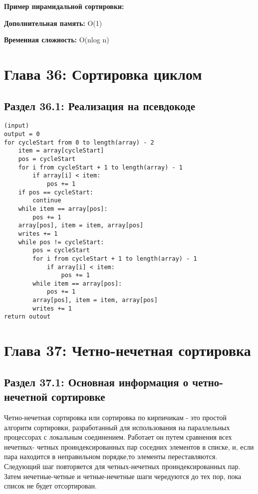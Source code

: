 \vspace{\baselineskip}
\textbf{Пример пирамидальной сортировки:}

\vspace{\baselineskip}

\vspace{\baselineskip}
\textbf{Дополнительная память:} O(1)

\textbf{Временная сложность:} O(nlog n)

\vspace{\baselineskip}

\chapter*{Глава 36: Сортировка циклом}
\section*{Раздел 36.1: Реализация на псевдокоде} 

\vspace{\baselineskip}
\begin{tcolorbox}
\begin{verbatim} 
(input)
output = 0
for cycleStart from 0 to length(array) - 2
    item = array[cycleStart]
    pos = cycleStart
    for i from cycleStart + 1 to length(array) - 1
        if array[i] < item:
            pos += 1
    if pos == cycleStart:
        continue
    while item == array[pos]:
        pos += 1
    array[pos], item = item, array[pos]
    writes += 1
    while pos != cycleStart:
        pos = cycleStart
        for i from cycleStart + 1 to length(array) - 1
            if array[i] < item:
                pos += 1
        while item == array[pos]:
            pos += 1
        array[pos], item = item, array[pos]
        writes += 1
return outout

\end{verbatim}
\end{tcolorbox}

\chapter*{Глава 37: Четно-нечетная сортировка}
\section*{Раздел 37.1: Основная информация о четно-нечетной сортировке} 

\vspace{\baselineskip}
Четно-нечетная сортировка или сортировка по кирпичикам - это простой алгоритм сортировки, разработанный для использования на параллельных процессорах с локальным соединением. Работает он путем сравнения всех нечетных- четных проиндексированных пар соседних элементов в списке, и, если пара находится в неправильном порядке,то элементы переставляются. Следующий шаг повторяется для четных-нечетных проиндексированных пар. Затем нечетные-четные и четные-нечетные шаги чередуются до тех пор, пока список не будет отсортирован.

